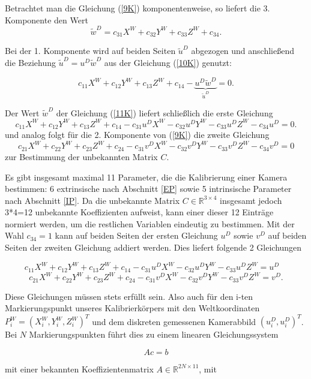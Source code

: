 {Betrachtet man die Gleichung (\ref{9K}) komponentenweise, so liefert die 3. Komponente den Wert 
\begin{equation} \label{11K}
    \tilde w^D = 
    c_{31}X^W +  c_{32}Y^W + c_{33} Z^W	+ c_{34}.
\end{equation}

Bei der 1. Komponente wird auf beiden Seiten $\tilde u^D $ abgezogen und
anschließend die Beziehung $\tilde u^D = u^D\tilde w^D$ aus der Gleichung (\ref{10K}) genutzt: 

\[
c_{11}X^W +  c_{12}Y^W + c_{13} Z^W	+ c_{14}-
\underbrace{u^D\tilde w^D}_{\tilde u^D} =0.
\]

Der Wert $\tilde w^D $ der Gleichung (\ref{11K}) liefert schließlich die erste Gleichung
\[
c_{11}X^W +  c_{12}Y^W + c_{13} Z^W	+ c_{14}- c_{31}u^D X^W -  c_{32}u^D Y^W - c_{33}u^D Z^W	- c_{34}u^D =0.
\]
und analog folgt für die 2. Komponente von (\ref{9K})  die zweite Gleichung
\[
c_{21}X^W +  c_{22}Y^W + c_{23} Z^W + c_{24}- c_{31}v^D X^W -  c_{32}v^D Y^W - c_{33}v^D Z^W	- c_{34}v^D =0
\]
zur Bestimmung der unbekannten Matrix $C$.

Es gibt insgesamt maximal 11 Parameter, die die  Kalibrierung einer Kamera bestimmen:
6 extrinsische nach Abschnitt \ref{EP} sowie 5 intrinsische Parameter nach Abschnitt \ref{IP}.
Da die unbekannte Matrix $C \in \mathbb{R}^{3 \times 4}$ insgesamt jedoch 3*4=12 unbekannte Koeffizienten
aufweist, kann einer dieser 12 Einträge normiert werden, um die restlichen Variablen eindeutig zu bestimmen.
Mit der Wahl $c_{34}=1$ kann auf beiden Seiten der ersten Gleichung $u^D$ 
sowie $v^D$ auf beiden Seiten der zweiten Gleichung addiert werden. 
Dies liefert folgende 2 Gleichungen

\[
c_{11}X^W +  c_{12} Y^W + c_{13} Z^W + c_{14} - c_{31}u^D X^W -  c_{32}u^D Y^W - c_{33}u^D Z^W	=u^D \quad
\]
\[
c_{21}X^W +  c_{22} Y^W + c_{23} Z^W + c_{24} - c_{31}v^D X^W -  c_{32}v^D Y^W - c_{33}v^D Z^W	=v^D. 
\]

Diese Gleichungen müssen stets erfüllt sein. Also auch für den i-ten Markierungspunkt unseres Kalibrierkörpers mit den Weltkoordinaten $P^W_i=(X^W_i, Y^W_i, Z^W_i)^T$ und dem diskreten gemessenen Kamerabbild $(u^D_i, u^D_i)^T$. Bei $N$ Markierungspunkten führt dies zu einem linearen Gleichungssystem 

\[
Ac=b
\]

mit einer bekannten Koeffizientenmatrix $A \in \mathbb{R}^{2N\times 11}$, mit

}
